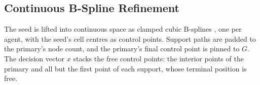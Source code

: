 \documentclass[letterpaper, 10 pt, conference]{ieeeconf}
\newtheorem{lemma}{Lemma}
\theoremstyle{remark}
\begin{document}





\subsection{Continuous B-Spline Refinement}
\label{sec:cont}

The seed is lifted into continuous space as clamped cubic B-splines
\cite{piegl1997nurbs}, one per agent, with the seed's cell centres as control points. Support paths are padded to the primary's node count, and
the primary's final control point is pinned to $G$. The decision vector $x$
stacks the free control points: the interior points of the primary and all
but the first point of each support, whose terminal position is free.
\end{document}

